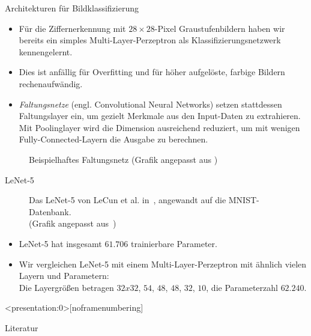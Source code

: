 \documentclass[envcountsect, smaller, aspectratio=149]{beamer}
\newenvironment{noheadline}{
	\setbeamertemplate{headline}{}
}{}
\begin{document}
\begin{frame}{Architekturen für Bildklassifizierung}
    \begin{itemize}
        \item Für die Ziffernerkennung mit $28\times 28$-Pixel Graustufenbildern haben wir bereits ein simples Multi-Layer-Perzeptron als Klassifizierungsnetzwerk kennengelernt.
        \pause\item Dies ist anfällig für Overfitting und für höher aufgelöste, farbige Bildern rechenaufwändig.
        \pause\item \emph{Faltungsnetze} (engl. \foreignlanguage{english}{Convolutional Neural Networks}) setzen stattdessen Faltungslayer ein, um gezielt Merkmale aus den Input-Daten zu extrahieren.
        Mit Poolinglayer wird die Dimension ausreichend reduziert, um mit wenigen Fully-Connected-Layern die Ausgabe zu berechnen.
    \end{itemize}

    \begin{figure}
        \newcommand{\svgwidth}{0.8\textwidth}
        {\scriptsize
        
        }
        \caption{Beispielhaftes Faltungsnetz
        {\scriptsize (Grafik angepasst aus \cite{Calin2020})}}
    \end{figure}
\end{frame}

\begin{frame}{LeNet-5}
\begin{figure}
        \newcommand{\svgwidth}{\textwidth}
        {\scriptsize
    
        }
    \caption{Das LeNet-5 von LeCun et al. in~\cite{lecun1998}, angewandt auf die MNIST-Datenbank.\\
    {\scriptsize(Grafik angepasst aus~\cite{lecun1998})}}
\end{figure}

\begin{itemize}
    \item LeNet-5 hat insgesamt $61.706$ trainierbare Parameter.
    \item Wir vergleichen LeNet-5 mit einem Multi-Layer-Perzeptron mit ähnlich vielen Layern und Parametern: \\
    Die Layergrößen betragen $32x32$, $54$, $48$, $48$, $32$, $10$, die  Parameterzahl $62.240$.
\end{itemize}
\end{frame}

\begin{frame}<presentation:0>[noframenumbering]
    \cite{Calin2020}
    \cite{Goodfellow-et-al-2016}
\end{frame}

\begin{noheadline}
\begin{frame}[allowframebreaks]{Literatur}
	\scriptsize
	
\end{frame}
\end{noheadline}
\end{document}
